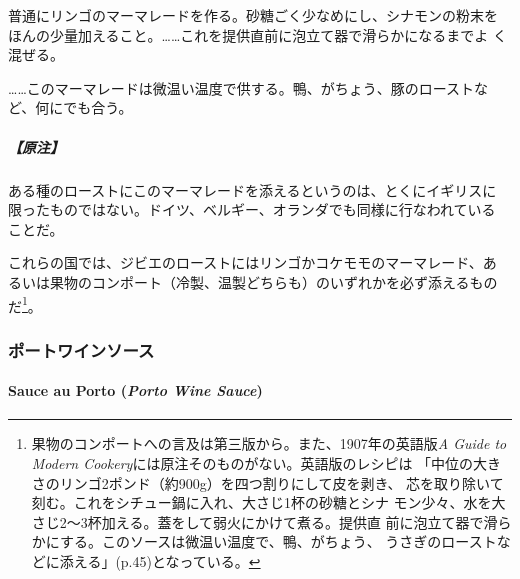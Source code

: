 \begin{recette}
普通にリンゴのマーマレードを作る。砂糖ごく少なめにし、シナモンの粉末を
ほんの少量加えること。\ldots{}\ldots{}これを提供直前に泡立て器で滑らかになるまでよ
く混ぜる。

\ldots{}\ldots{}このマーマレードは微温い温度で供する。鴨、がちょう、豚のローストなど、何にでも合う。

\hypertarget{ux539fux6ce8-1}{%
\subparagraph{【原注】}\label{ux539fux6ce8-1}}

ある種のローストにこのマーマレードを添えるというのは、とくにイギリスに
限ったものではない。ドイツ、ベルギー、オランダでも同様に行なわれている
ことだ。

これらの国では、ジビエのローストにはリンゴかコケモモのマーマレード、あ
るいは果物のコンポート（冷製、温製どちらも）のいずれかを必ず添えるもの
だ\footnote{果物のコンポートへの言及は第三版から。また、1907年の英語版\emph{A
  Guide to Modern Cookery}には原注そのものがない。英語版のレシピは
  「中位の大きさのリンゴ2ポンド（約900g）を四つ割りにして皮を剥き、
  芯を取り除いて刻む。これをシチュー鍋に入れ、大さじ1杯の砂糖とシナ
  モン少々、水を大さじ2〜3杯加える。蓋をして弱火にかけて煮る。提供直
  前に泡立て器で滑らかにする。このソースは微温い温度で、鴨、がちょう、
  うさぎのローストなどに添える」(p.45)となっている。}。

\maeaki

\hypertarget{ux30ddux30fcux30c8ux30efux30a4ux30f3ux30bdux30fcux30b9}{%
\subsubsection{ポートワインソース}\label{ux30ddux30fcux30c8ux30efux30a4ux30f3ux30bdux30fcux30b9}}

\hypertarget{porto-wine-sauce}{%
\paragraph{\texorpdfstring{Sauce au Porto (\emph{Porto Wine
Sauce})}{Sauce au Porto (Porto Wine Sauce)}}\label{porto-wine-sauce}}



\end{recette}
